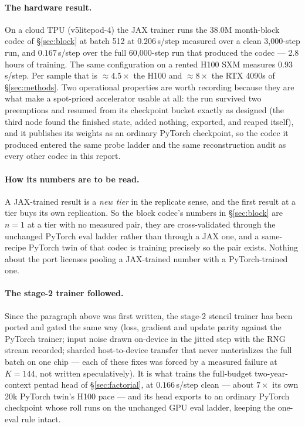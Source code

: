 \documentclass[10pt]{article}
\begin{document}
\paragraph{The hardware result.} On a cloud TPU (v5litepod-4) the JAX
trainer runs the 38.0M month-block codec of \S\ref{sec:block} at batch 512 at
$0.206$\,s/step measured over a clean 3{,}000-step run, and $0.167$\,s/step
over the full 60{,}000-step run that produced the codec --- 2.8 hours of
training. The same configuration on a rented H100 SXM measures
$0.93$\,s/step. Per sample that is $\approx$$4.5\times$ the H100 and
$\approx$$8\times$ the RTX 4090s of \S\ref{sec:methods}. Two operational
properties are worth recording because they are what make a spot-priced
accelerator usable at all: the run survived two preemptions and resumed from
its checkpoint bucket exactly as designed (the third node found the finished
state, added nothing, exported, and reaped itself), and it publishes its
weights as an ordinary PyTorch checkpoint, so the codec it produced entered
the same probe ladder and the same reconstruction audit as every other
codec in this report.

\paragraph{How its numbers are to be read.} A JAX-trained result is a
\emph{new tier} in the replicate sense, and the first result at a tier buys
its own replication. So the block codec's numbers in \S\ref{sec:block} are
$n=1$ at a tier with no measured pair, they are cross-validated through the
unchanged PyTorch eval ladder rather than through a JAX one, and a
same-recipe PyTorch twin of that codec is training precisely so the pair
exists. Nothing about the port licenses pooling a JAX-trained number with a
PyTorch-trained one.

\paragraph{The stage-2 trainer followed.} Since the paragraph above was
first written, the stage-2 stencil trainer has been ported and gated the
same way (loss, gradient and update parity against the PyTorch trainer;
input noise drawn on-device in the jitted step with the RNG stream
recorded; sharded host-to-device transfer that never materializes the
full batch on one chip --- each of these fixes was forced by a measured
failure at $K{=}144$, not written speculatively). It is what trains the
full-budget two-year-context pentad head of \S\ref{sec:factorial}, at
$0.166$\,s/step clean --- about $7\times$ its own 20k PyTorch twin's
H100 pace --- and its head exports to an ordinary PyTorch checkpoint
whose roll runs on the unchanged GPU eval ladder, keeping the one-eval
rule intact.
\end{document}
